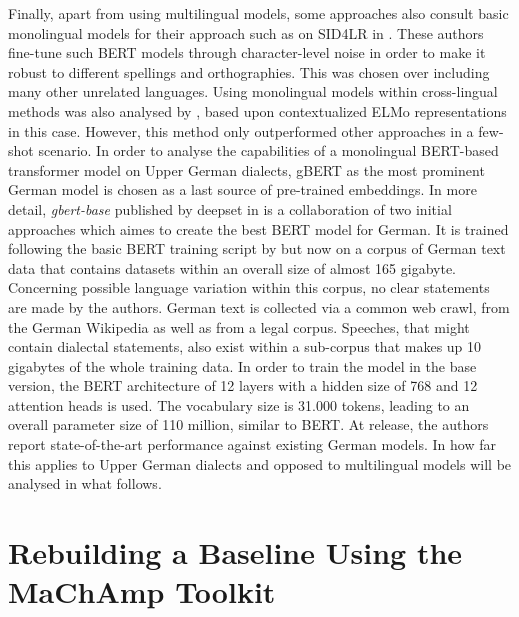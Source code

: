 \documentclass[11pt,a4paper,twoside,openright]{scrbook}
\begin{document}
Finally, apart from using multilingual models, some approaches also consult basic monolingual models for their approach such as \citet{srivastava-chiang-2023-fine} on SID4LR in \citet{2023-findings-vardial}. These authors fine-tune such BERT models through character-level noise in order to make it robust to different spellings and orthographies. This was chosen over including many other unrelated languages. Using monolingual models within cross-lingual methods was also analysed by \citet{schuster-etal-2019-cross-lingual}, based upon contextualized ELMo representations in this case. However, this method only outperformed other approaches in a few-shot scenario. In order to analyse the capabilities of a monolingual BERT-based transformer model on Upper German dialects, gBERT as the most prominent German model is chosen as a last source of pre-trained embeddings. In more detail, \textit{gbert-base} published by deepset in \citet{chan-etal-2020-germans} is a collaboration of two initial approaches which aimes to create the best BERT model for German. It is trained following the basic BERT training script by \citet{devlin-etal-2019-bert} but now on a corpus of German text data that contains datasets within an overall size of almost 165 gigabyte. Concerning possible language variation within this corpus, no clear statements are made by the authors. German text is collected via a common web crawl, from the German Wikipedia as well as from a legal corpus. Speeches, that might contain dialectal statements, also exist within a sub-corpus that makes up 10 gigabytes of the whole training data. In order to train the model in the base version, the BERT architecture of 12 layers with a hidden size of 768 and 12 attention heads is used. The vocabulary size is 31.000 tokens, leading to an overall parameter size of 110 million, similar to BERT. At release, the authors report state-of-the-art performance against existing German models. In how far this applies to Upper German dialects and opposed to multilingual models will be analysed in what follows.







\section{Rebuilding a Baseline Using the MaChAmp Toolkit}
\end{document}
